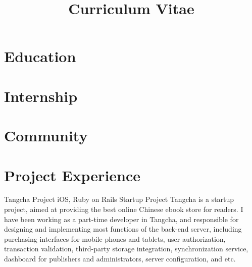 \documentclass[11pt,a4paper]{moderncv}
\title{Curriculum Vitae}
\begin{document}
\maketitle

\section{Education}


\section{Internship}

\section{Community}

\section{Project Experience}

{Tangcha Project}
{iOS, Ruby on Rails}
{Startup Project}{}
{
Tangcha is a startup project, aimed at providing the best online
Chinese ebook store for readers. I have been working as a part-time
developer in Tangcha, and responsible for designing and implementing
most functions of the back-end server, including purchasing interfaces
for mobile phones and tablets, user authorization, transaction
validation, third-party storage integration, synchronization service,
dashboard for publishers and administrators, server configuration, and
etc.
}
\end{document}
